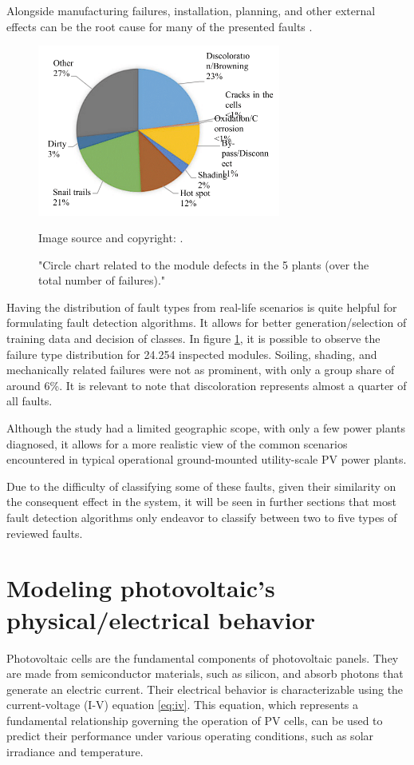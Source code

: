 Alongside manufacturing failures, installation, planning, and other external effects can be the root cause for many of the presented faults \cite{sunny}.

\begin{figure}[h]
    \centering
    \includegraphics[width=8cm]{figures/chapter2/chartfailsurvey.png} \caption{"Circle chart related to the module defects in the 5 plants (over the total number of failures)."} Image source and copyright: \cite{Grimaccia2017}.
    \label{fig:faultchart}
\end{figure}

Having the distribution of fault types from real-life scenarios is quite helpful for formulating fault detection algorithms. It allows for better generation/selection of training data and decision of classes. In figure \ref{fig:faultchart}, it is possible to observe the failure type distribution for 24.254 inspected modules. Soiling, shading, and mechanically related failures were not as prominent, with only a group share of around 6\%. It is relevant to note that discoloration represents almost a quarter of all faults.

Although the study had a limited geographic scope, with only a few power plants diagnosed, it allows for a more realistic view of the common scenarios encountered in typical operational ground-mounted utility-scale PV power plants.

Due to the difficulty of classifying some of these faults, given their similarity on the consequent effect in the system, it will be seen in further sections that most fault detection algorithms only endeavor to classify between two to five types of reviewed faults.

\section{Modeling photovoltaic's physical/electrical behavior}

Photovoltaic cells are the fundamental components of photovoltaic panels. They are made from semiconductor materials, such as silicon,  and absorb photons that generate an electric current. Their electrical behavior is characterizable using the current-voltage (I-V) equation \ref{eq:iv}. This equation, which represents a fundamental relationship governing the operation of PV cells, can be used to predict their performance under various operating conditions, such as solar irradiance and temperature.

